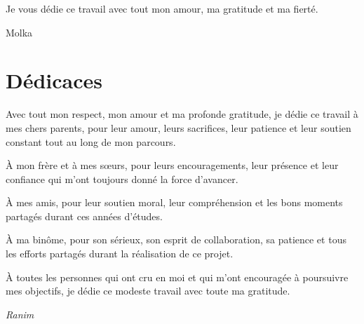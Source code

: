 \documentclass[12pt,a4paper,oneside]{report}
\begin{document}
Je vous dédie ce travail avec tout mon amour, ma gratitude et ma fierté.

\begin{flushright}
Molka
\end{flushright}
\clearpage

\chapter*{Dédicaces}

\vspace*{1.5cm}

\begin{center}
\begin{minipage}{0.82\textwidth}

Avec tout mon respect, mon amour et ma profonde gratitude, je dédie ce travail à mes chers parents, pour leur amour, leurs sacrifices, leur patience et leur soutien constant tout au long de mon parcours.

\vspace{0.4cm}

À mon frère et à mes sœurs, pour leurs encouragements, leur présence et leur confiance qui m’ont toujours donné la force d’avancer.

\vspace{0.4cm}

À mes amis, pour leur soutien moral, leur compréhension et les bons moments partagés durant ces années d’études.

\vspace{0.4cm}

À ma binôme, pour son sérieux, son esprit de collaboration, sa patience et tous les efforts partagés durant la réalisation de ce projet.

\vspace{0.4cm}

À toutes les personnes qui ont cru en moi et qui m’ont encouragée à poursuivre mes objectifs, je dédie ce modeste travail avec toute ma gratitude.

\vspace{1.2cm}

\begin{flushright}
\textit{Ranim}
\end{flushright}

\end{minipage}
\end{center}

\clearpage

\clearpage
\end{document}
